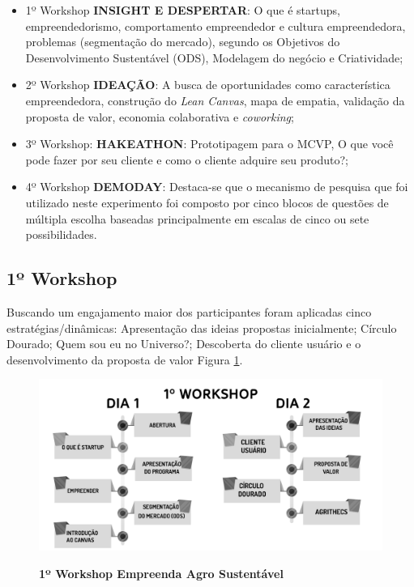 \begin{itemize}

\item {1º Workshop \textbf{INSIGHT E DESPERTAR}: O que é startups, empreendedorismo, comportamento empreendedor e cultura empreendedora, problemas (segmentação do mercado), segundo os Objetivos do Desenvolvimento Sustentável (ODS), Modelagem do negócio e Criatividade;}
\item {2º Workshop \textbf{IDEAÇÃO}: A busca de oportunidades como característica empreendedora, construção do \textit{\textit{Lean Canvas}}, mapa de empatia, validação da proposta de valor, economia colaborativa e \textit{coworking};}

\item {3º Workshop: \textbf{HAKEATHON}: Prototipagem para o MCVP, O que você pode fazer por seu cliente e como o cliente adquire seu produto?;}

\item {4º Workshop \textbf{DEMODAY}: Destaca-se que o mecanismo de pesquisa que foi utilizado neste experimento foi composto por cinco blocos de questões de múltipla escolha baseadas principalmente em escalas de cinco ou sete possibilidades.}
\end{itemize}


\subsection{1º Workshop}

Buscando um engajamento maior dos participantes foram
aplicadas cinco estratégias/dinâmicas: Apresentação das ideias propostas inicialmente; Círculo Dourado;
Quem sou eu no Universo?; Descoberta do cliente usuário e o  desenvolvimento da proposta de valor Figura \ref{figura_30}.

\begin{figure}[!h]
\centering
\caption{\textbf{1º Workshop Empreenda Agro Sustentável}}
\includegraphics[scale=0.4]{Imagens/workshop-01.png}
\label{figura_30}
\end{figure}

